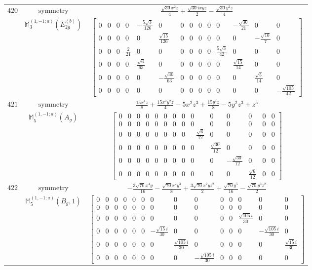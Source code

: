 \documentclass[fleqn,8pt,landscape]{jsarticle}
\begin{document}
\begin{longtable}{ccc}
$ 420 $ & $ \text{symmetry} $ & $ \frac{\sqrt{30} x^{2} z}{4} + \frac{\sqrt{30} i x y z}{2} - \frac{\sqrt{30} y^{2} z}{4} $ \\
$  $ & $ \mathbb{M}_{3}^{(1,-1;a)}(E_{2g}^{(b)}) $ & $ \begin{bmatrix} 0 & 0 & 0 & 0 & - \frac{5 \sqrt{3}}{126} & 0 & 0 & 0 & 0 & 0 & 0 & - \frac{\sqrt{30}}{21} & 0 & 0 \\ 0 & 0 & 0 & 0 & 0 & \frac{\sqrt{15}}{126} & 0 & 0 & 0 & 0 & 0 & 0 & - \frac{\sqrt{10}}{7} & 0 \\ 0 & 0 & 0 & \frac{2}{21} & 0 & 0 & 0 & 0 & 0 & 0 & \frac{5 \sqrt{3}}{42} & 0 & 0 & 0 \\ 0 & 0 & 0 & 0 & \frac{\sqrt{6}}{63} & 0 & 0 & 0 & 0 & 0 & 0 & \frac{\sqrt{15}}{14} & 0 & 0 \\ 0 & 0 & 0 & 0 & 0 & - \frac{\sqrt{30}}{63} & 0 & 0 & 0 & 0 & 0 & 0 & \frac{\sqrt{5}}{14} & 0 \\ 0 & 0 & 0 & 0 & 0 & 0 & 0 & 0 & 0 & 0 & 0 & 0 & 0 & - \frac{\sqrt{105}}{42} \end{bmatrix} $ \\ \hline
$ 421 $ & $ \text{symmetry} $ & $ \frac{15 x^{4} z}{8} + \frac{15 x^{2} y^{2} z}{4} - 5 x^{2} z^{3} + \frac{15 y^{4} z}{8} - 5 y^{2} z^{3} + z^{5} $ \\
$  $ & $ \mathbb{M}_{5}^{(1,-1;a)}(A_{g}) $ & $ \begin{bmatrix} 0 & 0 & 0 & 0 & 0 & 0 & 0 & 0 & 0 & 0 & 0 & 0 & 0 & 0 \\ 0 & 0 & 0 & 0 & 0 & 0 & 0 & 0 & 0 & 0 & 0 & 0 & 0 & 0 \\ 0 & 0 & 0 & 0 & 0 & 0 & 0 & 0 & - \frac{\sqrt{6}}{12} & 0 & 0 & 0 & 0 & 0 \\ 0 & 0 & 0 & 0 & 0 & 0 & 0 & 0 & 0 & \frac{\sqrt{30}}{12} & 0 & 0 & 0 & 0 \\ 0 & 0 & 0 & 0 & 0 & 0 & 0 & 0 & 0 & 0 & - \frac{\sqrt{30}}{12} & 0 & 0 & 0 \\ 0 & 0 & 0 & 0 & 0 & 0 & 0 & 0 & 0 & 0 & 0 & \frac{\sqrt{6}}{12} & 0 & 0 \end{bmatrix} $ \\ \hline
$ 422 $ & $ \text{symmetry} $ & $ - \frac{3 \sqrt{70} x^{4} y}{16} - \frac{\sqrt{70} x^{2} y^{3}}{8} + \frac{3 \sqrt{70} x^{2} y z^{2}}{2} + \frac{\sqrt{70} y^{5}}{16} - \frac{\sqrt{70} y^{3} z^{2}}{2} $ \\
$  $ & $ \mathbb{M}_{5}^{(1,-1;a)}(B_{g},1) $ & $ \begin{bmatrix} 0 & 0 & 0 & 0 & 0 & 0 & 0 & 0 & 0 & 0 & 0 & 0 & 0 & 0 \\ 0 & 0 & 0 & 0 & 0 & 0 & 0 & 0 & 0 & 0 & 0 & 0 & 0 & 0 \\ 0 & 0 & 0 & 0 & 0 & 0 & 0 & 0 & 0 & 0 & 0 & \frac{\sqrt{105} i}{30} & 0 & 0 \\ 0 & 0 & 0 & 0 & 0 & 0 & - \frac{\sqrt{15} i}{30} & 0 & 0 & 0 & 0 & 0 & - \frac{\sqrt{105} i}{30} & 0 \\ 0 & 0 & 0 & 0 & 0 & 0 & 0 & \frac{\sqrt{105} i}{30} & 0 & 0 & 0 & 0 & 0 & \frac{\sqrt{15} i}{30} \\ 0 & 0 & 0 & 0 & 0 & 0 & 0 & 0 & - \frac{\sqrt{105} i}{30} & 0 & 0 & 0 & 0 & 0 \end{bmatrix} $ \\ \hline

\end{longtable}
\end{document}
